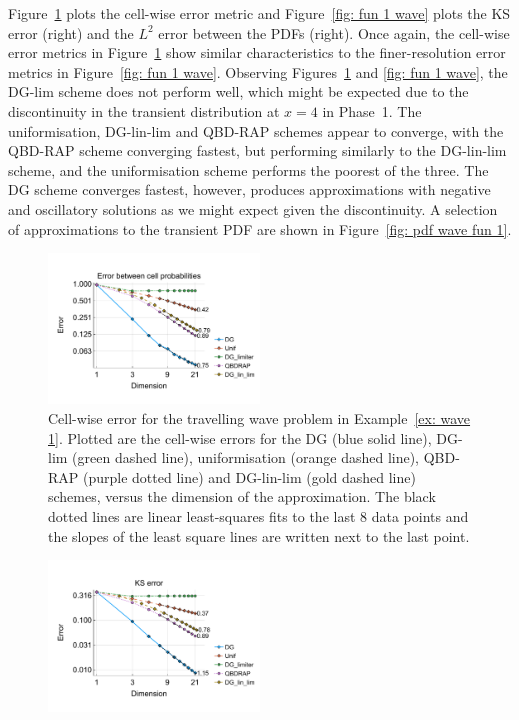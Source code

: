 \begin{example}
	Figure~\ref{fig: fun 1 wave cp} plots the cell-wise error metric and Figure~\ref{fig: fun 1 wave} plots the KS error (right) and the \(L^2\) error between the PDFs (right). Once again, the cell-wise error metrics in Figure~\ref{fig: fun 1 wave cp} show similar characteristics to the finer-resolution error metrics in Figure~\ref{fig: fun 1 wave}. Observing Figures~\ref{fig: fun 1 wave cp} and \ref{fig: fun 1 wave}, the DG-lim scheme does not perform well, which might be expected due to the discontinuity in the transient distribution at \(x=4\) in Phase~1. The uniformisation, DG-lin-lim and QBD-RAP schemes appear to converge, with the QBD-RAP scheme converging fastest, but performing similarly to the DG-lin-lim scheme, and the uniformisation scheme performs the poorest of the three. The DG scheme converges fastest, however, produces approximations with negative and oscillatory solutions as we might expect given the discontinuity. A selection of approximations to the transient PDF are shown in Figure~\ref{fig: pdf wave fun 1}.
	\begin{figure}[h]
		\centering
		\includegraphics[width=0.5\textwidth,trim={0.75cm 0.8cm 0.25cm 1.25cm},clip]{chapter6/figs/wave/fun1/L1_cell_probs.pdf} 
		\caption{Cell-wise error for the travelling wave problem in Example~\ref{ex: wave 1}. Plotted are the cell-wise errors for the DG (blue solid line), DG-lim (green dashed line), uniformisation (orange dashed line), QBD-RAP (purple dotted line) and DG-lin-lim (gold dashed line) schemes, versus the dimension of the approximation. The black dotted lines are linear least-squares fits to the last 8 data points and the slopes of the least square lines are written next to the last point.}  
		\label{fig: fun 1 wave cp}  
	\end{figure}
	\begin{figure}[h]
		\centering
		\includegraphics[width=0.5\textwidth,trim={0.75cm 0.8cm 0.25cm 1.25cm},clip]{chapter6/figs/wave/fun1/meshs_ks_error_formatted.pdf}%

\end{figure}
\end{example}
